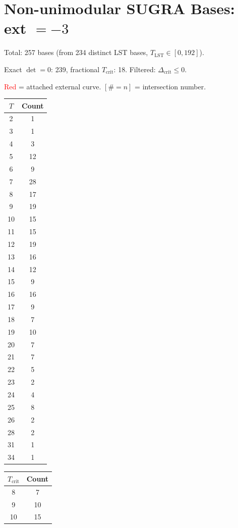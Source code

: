 \documentclass[10pt]{article}
\begin{document}
\section*{Non-unimodular SUGRA Bases: ext $= -3$}

Total: 257 bases (from 234 distinct LST bases, $T_{\text{LST}} \in [0, 192]$).

Exact $\det=0$: 239, fractional $T_{\text{crit}}$: 18. Filtered: $\Delta_{\text{crit}} \leq 0$.

\textcolor{red}{Red} = attached external curve. $\scriptstyle [\#=n]$ = intersection number.

\begin{center}
\begin{tabular}{c|c}
\toprule
$T$ & Count \\
\midrule
2 & 1 \\
3 & 1 \\
4 & 3 \\
5 & 12 \\
6 & 9 \\
7 & 28 \\
8 & 17 \\
9 & 19 \\
10 & 15 \\
11 & 15 \\
12 & 19 \\
13 & 16 \\
14 & 12 \\
15 & 9 \\
16 & 16 \\
17 & 9 \\
18 & 7 \\
19 & 10 \\
20 & 7 \\
21 & 7 \\
22 & 5 \\
23 & 2 \\
24 & 4 \\
25 & 8 \\
26 & 2 \\
28 & 2 \\
31 & 1 \\
34 & 1 \\
\bottomrule
\end{tabular}
\qquad\qquad
\begin{tabular}{c|c}
\toprule
$T_{\text{crit}}$ & Count \\
\midrule
8 & 7 \\
9 & 10 \\
10 & 15 \\

\end{tabular}
\end{center}
\end{document}
